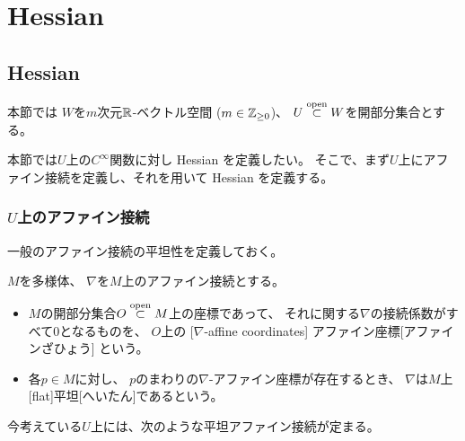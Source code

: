 \documentclass[report]{jlreq}
\begin{document}
%
\chapter{Hessian}

%
\section{Hessian}

本節では
$W$を$m$次元$\mathbb{R}$-ベクトル空間 ($m \in \mathbb{Z}_{\ge 0}$)、
$U \stackrel{\text{open}}{\subset} W$を開部分集合とする。

本節では$U$上の$C^\infty$関数に対し Hessian を定義したい。
そこで、まず$U$上にアファイン接続を定義し、それを用いて Hessian を定義する。

\subsection{$U$上のアファイン接続}

一般のアファイン接続の平坦性を定義しておく。

\begin{definition}[平坦アファイン接続]
    $M$を多様体、
    $\nabla$を$M$上のアファイン接続とする。
    \begin{itemize}
        \item $M$の開部分集合$O \stackrel{\text{open}}{\subset} M$上の座標であって、
            それに関する$\nabla$の接続係数がすべて$0$となるものを、
            $O$上の
            [$\nabla$-affine coordinates]
                {アファイン座標}[アファインざひょう]
            という。
        \item 各$p \in M$に対し、
            $p$のまわりの$\nabla$-アファイン座標が存在するとき、
            $\nabla$は$M$上
            [flat]{平坦}[へいたん]であるという。
    \end{itemize}
\end{definition}

今考えている$U$上には、次のような平坦アファイン接続が定まる。
\end{document}
